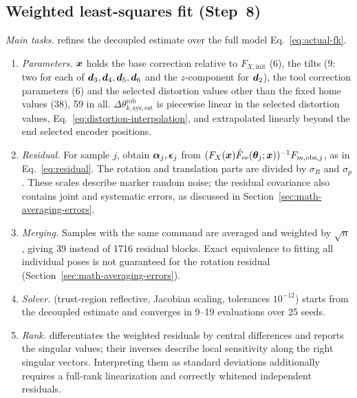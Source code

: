\documentclass[../main.tex]{subfiles}
\begin{document}
\subsection{Weighted least-squares fit (Step~8)}\label{sec:alg-fit}
\noindent\textit{Main tasks.}  refines the decoupled estimate over the full model Eq.~\eqref{eq:actual-fk}.
\begin{enumerate}
\renewcommand{\labelenumi}{\roman{enumi}.}
\item \textit{Parameters.} $\bm{x}$ holds the base correction relative to $F_{X,\mathrm{init}}$ (6), the tilts (9: two for each of $\bm{d}_3,\bm{d}_4,\bm{d}_5,\bm{d}_6$ and the $z$-component for $\bm{d}_2$), the tool correction parameters (6) and the selected distortion values other than the fixed home values (38), 59 in all. $\Delta\theta^{\mathrm{rob}}_{k,\mathrm{sys},\mathrm{est}}$ is piecewise linear in the selected distortion values, Eq.~\eqref{eq:distortion-interpolation}, and extrapolated linearly beyond the end selected encoder positions.
\item \textit{Residual.} For sample $j$, obtain $\bm{\alpha}_j,\bm{\epsilon}_j$ from $(F_X(\bm{x})\hat F_{\mathrm{ee}}(\bm{\theta}_j;\bm{x}))^{-1}F_{m,\mathrm{obs},j}$, as in Eq.~\eqref{eq:residual}. The rotation and translation parts are divided by $\sigma_R$ and $\sigma_p$. These scales describe marker random noise; the residual covariance also contains joint and systematic errors, as discussed in Section~\ref{sec:math-averaging-errors}.
\item \textit{Merging.} Samples with the same command are averaged and weighted by $\sqrt{n}$, giving 39 instead of 1716 residual blocks. Exact equivalence to fitting all individual poses is not guaranteed for the rotation residual (Section~\ref{sec:math-averaging-errors}).
\item \textit{Solver.}  (trust-region reflective, Jacobian scaling, tolerances $10^{-12}$) starts from the decoupled estimate and converges in 9--19 evaluations over 25 seeds.
\item \textit{Rank.}  differentiates the weighted residuals by central differences and reports the singular values; their inverses describe local sensitivity along the right singular vectors. Interpreting them as standard deviations additionally requires a full-rank linearization and correctly whitened independent residuals.
\end{enumerate}
\end{document}
